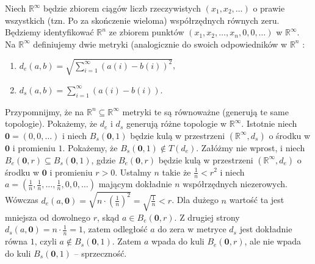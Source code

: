 \begin{eg}[1.1.7B]
	Niech $\mathbb{R}^{\infty}$ będzie zbiorem ciągów liczb rzeczywistych $\left( x_1,x_2,\ldots \right) $ o prawie wszystkich (tzn. Po za skończenie wieloma) współrzędnych równych zeru. Będziemy identyfikować $\mathbb{R}^{n}$ ze zbiorem punktów $\left( x_1,x_2,\ldots,x_{n},0,0,\ldots \right) $ w $\mathbb{R}^{\infty}$. Na $\mathbb{R}^{\infty}$ definiujemy dwie metryki (analogicznie do swoich odpowiedników w $\mathbb{R}^{n}$ :
	\begin{enumerate}[label=\arabic*)]
		\item $d_{e}\left( a,b \right) = \sqrt{\sum_{i = 1}^{\infty} \left( a\left( i \right) - b\left( i \right)  \right)^2 } $,
		\item $d_{s}\left( a,b \right) = \sum_{i = 1}^{\infty} \left( a\left( i \right) - b\left( i \right)  \right)  $.
	\end{enumerate}
Przypomnijmy, że na $\mathbb{R}^{n} \subseteq \mathbb{R}^{\infty}$ metryki te są równoważne (generują te same topologie). Pokażemy, że $d_{e}$ i $d_{s}$ generują różne topologie w $\mathbb{R}^{\infty}$. Istotnie niech $\mathbf{0} = \left( 0,0,\ldots \right) $ i niech $B_{s}\left( \mathbf{0},1 \right) $ będzie kulą w przestrzeni $\left( \mathbb{R}^{\infty}, d_{s} \right) $ o środku w $\mathbf{0}$ i promieniu $1$. Pokażemy, że $B_{s}\left( \mathbf{0}, 1 \right) \not\in T\left( d_{e} \right) $. Załóżmy nie wprost, i niech $B_{e}\left( \mathbf{0},r \right) \subseteq B_{s}\left( \mathbf{0}, 1 \right) $, gdzie $B_{e}\left( \mathbf{0},r \right) $ będzie kulą w przestrzeni $\left( \mathbb{R}^{\infty}, d_{e} \right) $ o środku w $\mathbf{0}$ i promieniu $r>0$. Ustalmy $n$ takie że $\frac{1}{n}< r^2$ i niech $a = \left( \frac{1}{n},\frac{1}{n},\ldots, \frac{1}{n},0,0,\ldots \right) $ mającym dokładnie $n$ współrzędnych niezerowych. Wówczas $d_{e}\left( a,\mathbf{0} \right) = \sqrt{n\cdot \left( \frac{1}{n} \right)^2} = \sqrt{\frac{1}{n}} < r $. Dla dużego $n$ wartość ta jest mniejsza od dowolnego $r$, skąd $a \in B_{e}\left( \mathbf{0},r \right) $. Z drugiej strony $d_{s}\left( a, \mathbf{0} \right) = n \cdot \frac{1}{n} = 1$, zatem odległość $a$ do zera w metryce $d_{s}$ jest dokładnie równa $1$, czyli $a \not\in B_{s}\left( \mathbf{0}, 1 \right) $. Zatem $a$ wpada do kuli $B_{e}\left( \mathbf{0},r \right) $, ale nie wpada do kuli $B_{s}\left( \mathbf{0},1 \right) $ -- sprzeczność.
\end{eg} 

